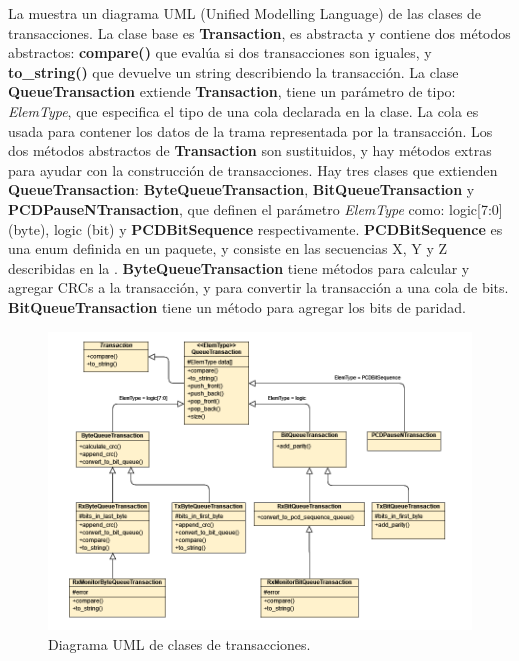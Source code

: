 \documentclass[a4paper, twoside, 11pt]{report}
\begin{document}
La  muestra un diagrama UML (Unified Modelling Language) de las clases de transacciones. La clase base es \textbf{Transaction}, es abstracta y contiene dos métodos abstractos: \textbf{compare()} que evalúa si dos transacciones son iguales, y \textbf{to\_string()} que devuelve un string describiendo la transacción. La clase \textbf{QueueTransaction} extiende \textbf{Transaction}, tiene un parámetro de tipo: \textit{ElemType}, que especifica el tipo de una cola declarada en la clase. La cola es usada para contener los datos de la trama representada por la transacción. Los dos métodos abstractos de \textbf{Transaction} son sustituidos, y hay métodos extras para ayudar con la construcción de transacciones. Hay tres clases que extienden \textbf{QueueTransaction}: \textbf{ByteQueueTransaction}, \textbf{BitQueueTransaction} y \textbf{PCDPauseNTransaction}, que definen el parámetro \textit{ElemType} como: logic[7:0] (byte), logic (bit) y \textbf{PCDBitSequence} respectivamente. \textbf{PCDBitSequence} es una enum definida en un paquete, y consiste en las secuencias X, Y y Z describidas en la . \textbf{ByteQueueTransaction} tiene métodos para calcular y agregar CRCs a la transacción, y para convertir la transacción a una cola de bits. \textbf{BitQueueTransaction} tiene un método para agregar los bits de paridad.

\begin{figure}[htb]
  \centering
  \includegraphics[width=1.0\textwidth]{./img/transactions_uml.vpd}
  \caption{Diagrama UML de clases de transacciones.}
  \label{fig:transaction_uml}
\end{figure}
\end{document}
